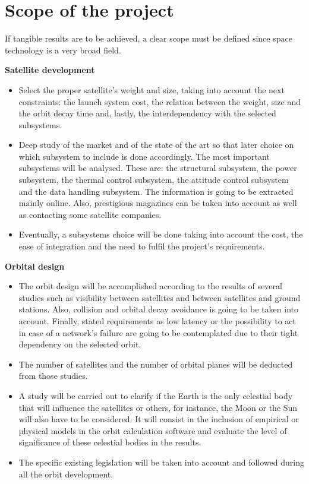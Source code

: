 \chapter{Scope of the project}
If tangible results are to be achieved, a clear scope must be defined since space technology is a very broad field.

{\bfseries Satellite development} 
\begin{itemize}
	\item Select the proper satellite's weight and size, taking into account the next constraints: the launch system cost, the relation between the weight, size and the orbit decay time and, lastly, the interdependency with the selected subsystems.
	\item Deep study of the market and of the state of the art so that later choice on which subsystem to include is done accordingly. The most important subsystems will be analysed. These are: the structural subsystem, the power subsystem, the thermal control subsystem, the attitude control subsystem and the data handling subsystem. The information is going to be extracted mainly online. Also, prestigious magazines can be taken into account as well as contacting some satellite companies.
	\item Eventually, a subsystems choice will be done taking into account the cost, the ease of integration and the need to fulfil the project's requirements.
\end{itemize}

{\bfseries Orbital design}

\begin{itemize}
	\item The orbit design will be accomplished according to the results of several studies such
as visibility between satellites and between satellites and ground stations. Also, collision
and orbital decay avoidance is going to be taken into account. Finally, stated requirements as low latency or the possibility to act in case of a network's failure are going to be contemplated due to their tight dependency on the selected orbit.
	\item The number of satellites and the number of orbital planes will be deducted from those
studies.
	\item A study will be carried out to clarify if the Earth is the only celestial body that will
influence the satellites or others, for instance, the Moon or the Sun will also have to
be considered. It will consist in the inclusion of empirical or physical models in the orbit calculation software and evaluate the level of significance of these celestial bodies in the results. 
	\item The specific existing legislation will be taken into  account and followed during all
the orbit development.

\end{itemize}

